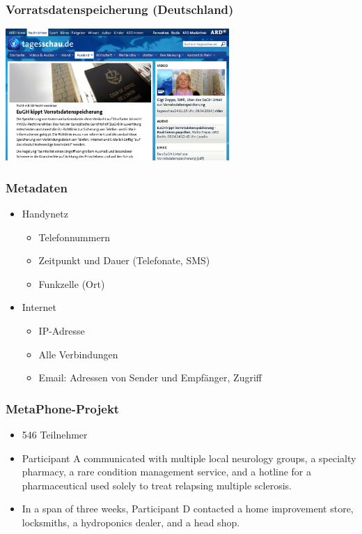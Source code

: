 \documentclass[12pt]{beamer}
\begin{document}
\begin{frame}
  \frametitle{Vorratsdatenspeicherung (Deutschland)}
    \begin{center}
      \includegraphics[height=5cm]{img/tagesschau-vds.png}
    \end{center}
\end{frame}

\begin{frame}
  \frametitle{Metadaten}
  \begin{itemize}
    \item Handynetz
      \begin{itemize}
        \item Telefonnummern
        \item Zeitpunkt und Dauer (Telefonate, SMS)
        \item Funkzelle (Ort)
      \end{itemize}
    \item Internet
      \begin{itemize}
        \item IP-Adresse
        \item Alle Verbindungen
        \item Email: Adressen von Sender und Empfänger, Zugriff
      \end{itemize}
  \end{itemize}
\end{frame}

\begin{frame}
    \frametitle{MetaPhone-Projekt}
    \begin{itemize}
        \item 546 Teilnehmer
        \item Participant A communicated with multiple local neurology groups, a specialty pharmacy, a rare condition management service, and a hotline for a pharmaceutical used solely to treat relapsing multiple sclerosis.
        \item In a span of three weeks, Participant D contacted a home improvement store, locksmiths, a hydroponics dealer, and a head shop.
    \end{itemize}
\end{frame}
\end{document}
